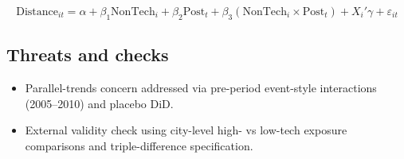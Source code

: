\documentclass[12pt]{article}
\begin{document}
\[
\text{Distance}_{it} = \alpha + \beta_1\text{NonTech}_i + \beta_2\text{Post}_t + \beta_3(\text{NonTech}_i\times\text{Post}_t) + X_i'\gamma + \varepsilon_{it}
\]

\subsection*{Threats and checks}
\begin{itemize}[leftmargin=*]
\item Parallel-trends concern addressed via pre-period event-style interactions (2005--2010) and placebo DiD.
\item External validity check using city-level high- vs low-tech exposure comparisons and triple-difference specification.
\end{itemize}
\end{document}
